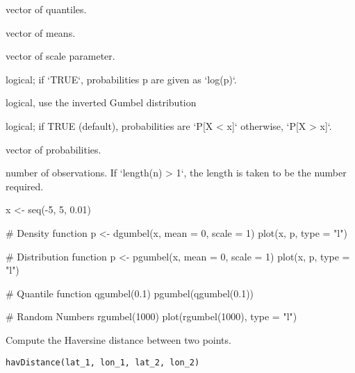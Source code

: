 \documentclass[a4paper]{book}
\begin{document}
%
\begin{Arguments}
\begin{ldescription}
\item[\code{x}] vector of quantiles.

\item[\code{mean}] vector of means.

\item[\code{scale}] vector of scale parameter.

\item[\code{log.p}] logical; if `TRUE`, probabilities p are given as `log(p)`.

\item[\code{invert}] logical, use the inverted Gumbel distribution

\item[\code{lower.tail}] logical; if TRUE (default), probabilities are `P[X < x]` otherwise, `P[X > x]`.

\item[\code{p}] vector of probabilities.

\item[\code{n}] number of observations. If `length(n) > 1`, the length is taken to be the number required.
\end{ldescription}
\end{Arguments}
%
\begin{Examples}
\begin{ExampleCode}
x <- seq(-5, 5, 0.01)

# Density function
p <- dgumbel(x, mean = 0, scale = 1)
plot(x, p, type = "l")

# Distribution function
p <- pgumbel(x, mean = 0, scale = 1)
plot(x, p, type = "l")

# Quantile function
qgumbel(0.1)
pgumbel(qgumbel(0.1))

# Random Numbers
rgumbel(1000)
plot(rgumbel(1000), type = "l")

\end{ExampleCode}
\end{Examples}
%
\begin{Description}\relax
Compute the Haversine distance between two points.
\end{Description}
%
\begin{Usage}
\begin{verbatim}
havDistance(lat_1, lon_1, lat_2, lon_2)
\end{verbatim}
\end{Usage}
\end{document}
